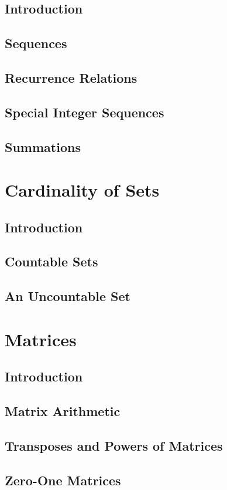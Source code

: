 \documentclass[11pt]{book}
\begin{document}
  \subsection{Introduction}
  \subsection{Sequences}
  \subsection{Recurrence Relations}
  \subsection{Special Integer Sequences}
  \subsection{Summations}
  
 \section{Cardinality of Sets}
  \subsection{Introduction}
  \subsection{Countable Sets}
  \subsection{An Uncountable Set}
  
 \section{Matrices}
  \subsection{Introduction}
  \subsection{Matrix Arithmetic}
  \subsection{Transposes and Powers of Matrices}
  \subsection{Zero-One Matrices}
  
\end{document}
